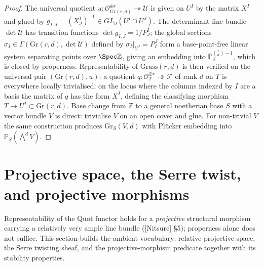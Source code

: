 \begin{proof}
  The universal quotient \(u : \mathcal{O}_{\mathrm{Gr}(r,d)}^{\oplus r}
  \twoheadrightarrow \mathcal{U}\) is given on \(U^I\) by the matrix \(X^I\)
  and glued by \(g_{I,J} = (X^I_J)^{-1} \in GL_d(U^I \cap U^J)\). The
  determinant line bundle \(\det\mathcal{U}\) has transition functions
  \(\det g_{I,J} = 1/P^I_J\); the global sections
  \(\sigma_I \in \Gamma(\mathrm{Gr}(r,d), \det\mathcal{U})\) defined by
  \(\sigma_I|_{U^J} = P^J_I\) form a base-point-free linear system separating
  points over \(\Spec\mathbb{Z}\), giving an embedding into
  \(\mathbb{P}^{\binom{r}{d}-1}_{\mathbb{Z}}\), which is closed by
  properness. Representability of \(\mathrm{Grass}(r,d)\) is then verified
  on the universal pair \((\mathrm{Gr}(r,d), u)\): a quotient
  \(q : \mathcal{O}_T^{\oplus r} \twoheadrightarrow \mathcal{F}\) of
  rank \(d\) on \(T\) is everywhere locally trivialised; on the locus where
  the columns indexed by \(I\) are a basis the matrix of \(q\) has the form
  \(X^I\), defining the classifying morphism \(T \to U^I \subset
  \mathrm{Gr}(r,d)\). Base change from \(\mathbb{Z}\) to a general noetherian
  base \(S\) with a vector bundle \(V\) is direct: trivialise \(V\) on an open
  cover and glue. For non-trivial \(V\) the same construction produces
  \(\mathrm{Gr}_S(V, d)\) with Pl\"ucker embedding into
  \(\mathbb{P}_S(\bigwedge^d V)\).
\end{proof}


\section{Projective space, the Serre twist, and projective morphisms}
\label{sec:projective_vocabulary}

Representability of the Quot functor holds for a \emph{projective} structural
morphism carrying a relatively very ample line bundle
([Nitsure] \S 5); properness alone does not suffice.  This
section builds the ambient vocabulary: relative projective space, the Serre
twisting sheaf, and the projective-morphism predicate together with its
stability properties.

